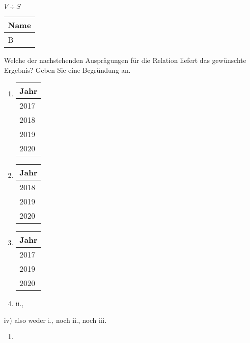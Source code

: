 \documentclass{bschlangaul-aufgabe}
\begin{document}
\begin{enumerate}
\begin{enumerate}
$V \div S$

\begin{center}

\begin{tabular}{|l|}
\hline
Name \\\hline\hline
B \\\hline
\end{tabular}
\end{center}

Welche der nachstehenden Ausprägungen für die Relation liefert das
gewünschte Ergebnis? Geben Sie eine Begründung an.

\begin{enumerate}
\item

\begin{tabular}{|l|}
\hline
Jahr\\\hline\hline
2017\\\hline
2018\\\hline
2019\\\hline
2020\\\hline
\end{tabular}

\item

\begin{tabular}{|l|}
\hline
Jahr\\\hline\hline
2018\\\hline
2019\\\hline
2020\\\hline
\end{tabular}

\item

\begin{tabular}{|l|}
\hline
Jahr\\\hline\hline
2017\\\hline
2019\\\hline
2020\\\hline
\end{tabular}

\item ii.,

\end{enumerate}

%

\begin{liAntwort}
iv) also weder i., noch ii., noch iii.

\begin{enumerate}
\item


\end{enumerate}
\end{liAntwort}
\end{enumerate}
\end{enumerate}
\end{document}
